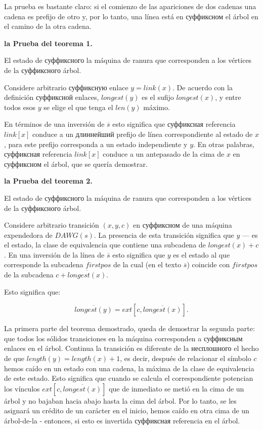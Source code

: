 La prueba es bastante claro: si el comienzo de las apariciones de dos cadenas una cadena es prefijo de otro y, por lo tanto, una línea está en суффиксном el árbol en el camino de la otra cadena.

\bf{la Prueba del teorema 1}. 

El estado de суффиксного la máquina de ranura que corresponden a los vértices de la суффиксного árbol.

Considere arbitrario суффиксную enlace $y = link(x)$. De acuerdo con la definición суффиксной enlaces, $longest(y)$ es el sufijo $longest(x)$, y entre todos esos $y$ se elige el que tenga el $len(y)$ máximo.

En términos de una inversión de $\overline{s}$ esto significa que суффиксная referencia $link[x]$ conduce a un длиннейший prefijo de línea correspondiente al estado de $x$, para este prefijo corresponda a un estado independiente y $y$. En otras palabras, суффиксная referencia $link[x]$ conduce a un antepasado de la cima de $x$ en суффиксном el árbol, que se quería demostrar.

\bf{la Prueba del teorema 2}.

El estado de суффиксного la máquina de ranura que corresponden a los vértices de la суффиксного árbol.

Considere arbitrario transición $(x,y,c)$ en суффиксном de una máquina expendedora de $DAWG(s)$. La presencia de esta transición significa que $y$ --- es el estado, la clase de equivalencia que contiene una subcadena de $longest(x) + c$. En una inversión de la línea de $\overline{s}$ esto significa que $y$ es el estado al que corresponde la subcadena $firstpos$ de la cual (en el texto $\overline{s}$) coincide con $firstpos$ de la subcadena $c + \overline{longest(x)}$.

Esto significa que:

$$ \overline{longest(y)} = ext[c, \overline{longest(x)}]. $$

La primera parte del teorema demostrado, queda de demostrar la segunda parte: que todos los sólidos transiciones en la máquina corresponden a суффиксным enlaces en el árbol. Continua la transición es diferente de la несплошного el hecho de que $length(y) = length(x) + 1$, es decir, después de relacionar el símbolo $c$ hemos caído en un estado con una cadena, la máxima de la clase de equivalencia de este estado. Esto significa que cuando se calcula el correspondiente potencian los vínculos $ext[c, \overline{longest(x)}]$ que de inmediato se metió en la cima de un árbol y no bajaban hacia abajo hasta la cima del árbol. Por lo tanto, se les asignará un crédito de un carácter en el inicio, hemos caído en otra cima de un árbol-de-la - entonces, si esto es invertida суффиксная referencia en el árbol.

